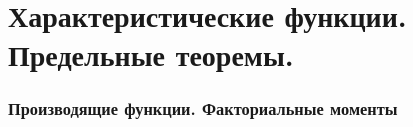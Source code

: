 \part{Характеристические функции. Предельные теоремы.}
\setcounter{equation}{0}
\section{Производящие функции. Факториальные моменты}
